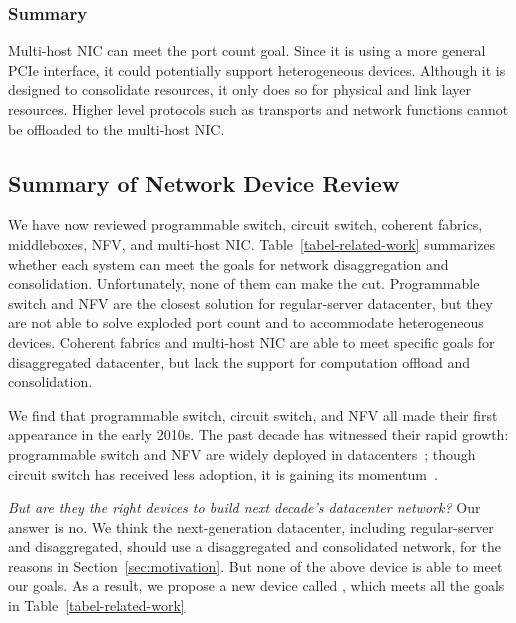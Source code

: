 \subsubsection{Summary}

Multi-host NIC can meet the port count goal.
Since it is using a more general PCIe interface, it could
potentially support heterogeneous devices.
Although it is designed to consolidate resources,
it only does so for physical and link layer resources.
Higher level protocols such as transports and network functions
cannot be offloaded to the multi-host NIC.

\subsection{Summary of Network Device Review}

We have now reviewed programmable switch,
circuit switch, coherent fabrics, middleboxes, NFV, and multi-host NIC.
Table~\ref{tabel-related-work} summarizes whether each system can meet
the goals for network disaggregation and consolidation.
Unfortunately, none of them can make the cut.
Programmable switch and NFV are the closest solution for regular-server
datacenter, but they are not able to solve exploded port count and
to accommodate heterogeneous devices. Coherent fabrics and multi-host NIC
are able to meet specific goals for disaggregated datacenter, but
lack the support for computation offload and consolidation.

We find that programmable switch, circuit switch, and NFV
all made their first appearance in the early 2010s.
The past decade has witnessed their rapid growth:
programmable switch and NFV are widely deployed in
datacenters~\cite{hpcc-sigcomm19,azure-nsdi18};
though circuit switch has received less adoption,
it is gaining its momentum~\cite{dRedBox-DATE,sirius-sigcomm20}.

\textit{But are they the right devices to build next decade's datacenter network?}
Our answer is no.
We think the next-generation datacenter,
including regular-server and disaggregated,
should use a disaggregated and consolidated network,
for the reasons in Section~\ref{sec:motivation}.
But none of the above device is able to meet our goals.
As a result, we propose a new device called \sysname,
which meets all the goals in Table~\ref{tabel-related-work}
\fi